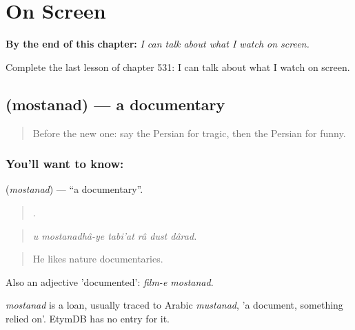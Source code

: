 
\chapter{On Screen}
\label{ch:fa-on-screen}

\begin{chapteropening}
\textbf{By the end of this chapter:} \emph{I can talk about what I watch on screen.}

Complete the last lesson of chapter 531: I can talk about what I watch on screen.
\end{chapteropening}

\section[\texorpdfstring{\fa{مستند} (mostanad)}{مستند (mostanad)}]{ (mostanad) — a documentary}

\label{lesson:FA-C531-mostanad}



\begin{quote}
Before the new one: say the Persian for tragic, then the Persian for funny.
\end{quote}

\subsection*{You'll want to know: }
\textbf{} (\emph{mostanad}) — \textquotedblleft{}a documentary\textquotedblright{}.

\begin{quote}
     .
\end{quote}

\begin{quote}
\emph{u mostanadhâ-ye tabi'at râ dust dârad.}
\end{quote}

\begin{quote}
He likes nature documentaries.
\end{quote}

Also an adjective 'documented': \emph{film-e mostanad}.

\begin{cousinweb}
\emph{mostanad} is a loan, usually traced to Arabic \emph{mustanad}, 'a document, something relied on'. EtymDB has no entry for it.
\end{cousinweb}


